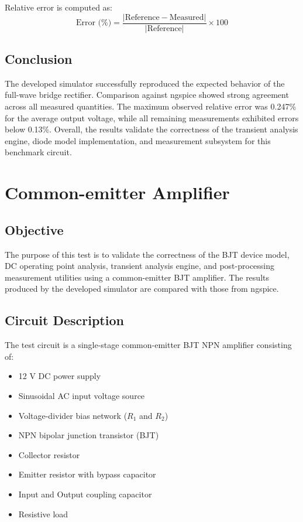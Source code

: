 Relative error is computed as: 
\begin{equation}
\text{Error (\%)} = \frac{|\text{Reference} - \text{Measured}|}{|\text{Reference}|} \times 100
\end{equation}

\subsection{Conclusion}
The developed simulator successfully reproduced the expected behavior of the full-wave bridge rectifier. Comparison against ngspice showed strong agreement across all measured quantities. The maximum observed relative error was 0.247\% for the average output voltage, while all remaining measurements exhibited errors below 0.13\%. Overall, the results validate the correctness of the transient analysis engine, diode model implementation, and measurement subsystem for this benchmark circuit.


\newpage
\section{Common-emitter Amplifier}

\subsection{Objective}
The purpose of this test is to validate the correctness of the BJT device model, DC operating point analysis, transient analysis engine, and post-processing measurement utilities using a common-emitter BJT amplifier. The results produced by the developed simulator are compared with those from ngspice.

\subsection{Circuit Description}
The test circuit is a single-stage common-emitter BJT NPN amplifier consisting of:
\begin{itemize}
    \item 12 V DC power supply
    \item Sinusoidal AC input voltage source
    \item Voltage-divider bias network ($R_1$ and $R_2$)
    \item NPN bipolar junction transistor (BJT)
    \item Collector resistor
    \item Emitter resistor with bypass capacitor
    \item Input and Output coupling capacitor
    \item Resistive load
\end{itemize}

